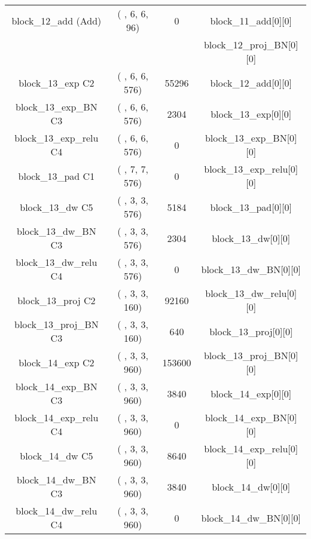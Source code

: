 \documentclass{bmvc2k}
\begin{document}
\begin{table}
\begin{tabular}{|c|c|c|c|}
\end{tabular}
\end{table}

\begin{table}
\centering
\begin{tabular}{|c|c|c|c|}

block\_12\_add (Add)              & ( , 6, 6, 96)   &  0      &     block\_11\_add[0][0]               \\ 
                                &                    &         &      block\_12\_proj\_BN[0][0]        \\ \hline
block\_13\_exp C2        & ( , 6, 6, 576)  &  55296  &     block\_12\_add[0][0]               \\ \hline
block\_13\_exp\_BN C3 & ( , 6, 6, 576)  &  2304   &     block\_13\_exp[0][0]            \\ \hline
block\_13\_exp\_relu C4     & ( , 6, 6, 576)  &  0      &     block\_13\_exp\_BN[0][0]         \\ \hline
block\_13\_pad C1    & ( , 7, 7, 576)  &  0      &     block\_13\_exp\_relu[0][0]       \\ \hline
block\_13\_dw C5 & ( , 3, 3, 576)  &  5184   &     block\_13\_pad[0][0]               \\ \hline
block\_13\_dw\_BN C3 & ( , 3, 3, 576)  &  2304   &     block\_13\_dw[0][0]         \\ \hline
block\_13\_dw\_relu C4  & ( , 3, 3, 576)  &  0      &     block\_13\_dw\_BN[0][0]      \\ \hline
block\_13\_proj C2       & ( , 3, 3, 160)  &  92160  &     block\_13\_dw\_relu[0][0]    \\ \hline
block\_13\_proj\_BN C3 & ( , 3, 3, 160)  &  640    &     block\_13\_proj[0][0]           \\ \hline
block\_14\_exp C2        & ( , 3, 3, 960)  &  153600 &     block\_13\_proj\_BN[0][0]        \\ \hline
block\_14\_exp\_BN C3 & ( , 3, 3, 960)  &  3840   &     block\_14\_exp[0][0]            \\ \hline
block\_14\_exp\_relu C4     & ( , 3, 3, 960)  &  0      &     block\_14\_exp\_BN[0][0]         \\ \hline
block\_14\_dw C5 & ( , 3, 3, 960)  &  8640   &     block\_14\_exp\_relu[0][0]       \\ \hline
block\_14\_dw\_BN C3 & ( , 3, 3, 960)  &  3840   &     block\_14\_dw[0][0]         \\ \hline
block\_14\_dw\_relu C4  & ( , 3, 3, 960)  &  0      &     block\_14\_dw\_BN[0][0]      \\ \hline

\end{tabular}
\end{table}
\end{document}
